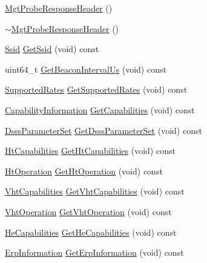 \begin{DoxyCompactItemize}
\item 
\hyperlink{classns3_1_1MgtProbeResponseHeader_aa100c4cac84d15dfc50c7aa6ee2e5c9b}{Mgt\+Probe\+Response\+Header} ()
\item 
\hyperlink{classns3_1_1MgtProbeResponseHeader_ab0587a9b0a9292ed3e34195128558488}{$\sim$\+Mgt\+Probe\+Response\+Header} ()
\item 
\hyperlink{classns3_1_1Ssid}{Ssid} \hyperlink{classns3_1_1MgtProbeResponseHeader_a2645e1a391efcdcc00669907434b6161}{Get\+Ssid} (void) const 
\item 
uint64\+\_\+t \hyperlink{classns3_1_1MgtProbeResponseHeader_abae0dc65485b82871fa87d72a86c6555}{Get\+Beacon\+Interval\+Us} (void) const 
\item 
\hyperlink{classns3_1_1SupportedRates}{Supported\+Rates} \hyperlink{classns3_1_1MgtProbeResponseHeader_a6beb46b3a4a382741976833a72df633c}{Get\+Supported\+Rates} (void) const 
\item 
\hyperlink{classns3_1_1CapabilityInformation}{Capability\+Information} \hyperlink{classns3_1_1MgtProbeResponseHeader_a6f79974ffac5c424f947bc888ea9b9f6}{Get\+Capabilities} (void) const 
\item 
\hyperlink{classns3_1_1DsssParameterSet}{Dsss\+Parameter\+Set} \hyperlink{classns3_1_1MgtProbeResponseHeader_a0aadc19f50cbe0ce2919eb38c0edf4fc}{Get\+Dsss\+Parameter\+Set} (void) const 
\item 
\hyperlink{classns3_1_1HtCapabilities}{Ht\+Capabilities} \hyperlink{classns3_1_1MgtProbeResponseHeader_a1d641ddc21b14bd7f066528e21f5bec0}{Get\+Ht\+Capabilities} (void) const 
\item 
\hyperlink{classns3_1_1HtOperation}{Ht\+Operation} \hyperlink{classns3_1_1MgtProbeResponseHeader_a5958c57612e4a5acc017f7af6889bd11}{Get\+Ht\+Operation} (void) const 
\item 
\hyperlink{classns3_1_1VhtCapabilities}{Vht\+Capabilities} \hyperlink{classns3_1_1MgtProbeResponseHeader_a36c3925485b70776c78491ea2da376bf}{Get\+Vht\+Capabilities} (void) const 
\item 
\hyperlink{classns3_1_1VhtOperation}{Vht\+Operation} \hyperlink{classns3_1_1MgtProbeResponseHeader_a8a0db2b7005eed9bd133f78095c7e618}{Get\+Vht\+Operation} (void) const 
\item 
\hyperlink{classns3_1_1HeCapabilities}{He\+Capabilities} \hyperlink{classns3_1_1MgtProbeResponseHeader_a28c68efe1ddf9c3a59ce942905b346ad}{Get\+He\+Capabilities} (void) const 
\item 
\hyperlink{classns3_1_1ErpInformation}{Erp\+Information} \hyperlink{classns3_1_1MgtProbeResponseHeader_a25b17ea9d1654f74ce6e92be79b8131c}{Get\+Erp\+Information} (void) const 

\end{DoxyCompactItemize}

